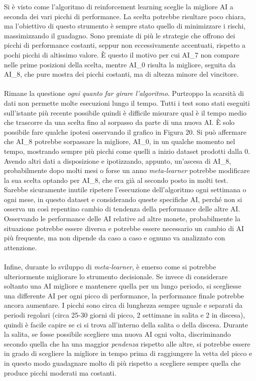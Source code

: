 \documentclass[a4paper,12pt]{report}
\begin{document}
\begin{fig}
Si è visto come l'algoritmo di reinforcement learning sceglie la migliore AI a seconda dei vari picchi di performance. La scelta potrebbe risultare poco chiara, ma l'obiettivo di questo strumento è sempre stato quello di minimizzare i rischi, massimizzando il guadagno. Sono premiate di più le strategie che offrono dei picchi di performance costanti, seppur non eccessivamente accentuati, rispetto a pochi picchi di altissimo valore. È questo il motivo per cui AI\_7 non compare nelle prime posizioni della scelta, mentre AI\_0 risulta la migliore, seguita da AI\_8, che pure mostra dei picchi costanti, ma di altezza minore del vincitore.
\\~\\Rimane la questione \textit{ogni quanto far girare l'algoritmo}. Purtroppo la scarsità di dati non permette molte esecuzioni lungo il tempo. Tutti i test sono stati eseguiti sull'istante più recente possibile quindi è difficile misurare qual è il tempo medio che trascorre da una scelta fino al sorpasso da parte di una nuova AI. È solo possibile fare qualche ipotesi osservando il grafico in Figura 20. Si può affermare che AI\_8 potrebbe sorpassare la migliore, AI\_0, in un qualche momento nel tempo, mostrando sempre più picchi come quelli a inizio dataset prodotti dalla 0. Avendo altri dati a disposizione e ipotizzando, appunto, un'ascesa di AI\_8, probabilmente dopo molti mesi o forse un anno \textit{meta-learner} potrebbe modificare la sua scelta optando per AI\_8, che era già al secondo posto in molti test. Sarebbe sicuramente inutile ripetere l'esecuzione dell'algoritmo ogni settimana o ogni mese, in questo dataset e considerando queste specifiche AI, perché non si osserva un così repentino cambio di tendenza della performance delle altre AI.\\Osservando le performance delle AI relative ad altre monete, probabilmente la situazione potrebbe essere diversa e potrebbe essere necessario un cambio di AI più frequente, ma non dipende da caso a caso e ognuno va analizzato con attenzione.
\\~\\Infine, durante lo sviluppo di \textit{meta-learner}, è emerso come si potrebbe ulteriormente migliorare lo strumento decisionale. Se invece di considerare soltanto una AI migliore e mantenere quella per un lungo periodo, si scegliesse una differente AI per ogni picco di performance, la performance finale potrebbe ancora aumentare. I picchi sono circa di lunghezza sempre uguale e separati da periodi regolari (circa 25-30 giorni di picco, 2 settimane in salita e 2 in discesa), quindi è facile capire se ci si trova all'interno della salita o della discesa. Durante la salita, se fosse possibile scegliere una nuova AI ogni volta, discriminando secondo quella che ha una maggior \textit{pendenza} rispetto alle altre, si potrebbe essere in grado di scegliere la migliore in tempo prima di raggiungere la vetta del picco e in questo modo guadagnare molto di più rispetto a scegliere sempre quella che produce picchi moderati ma costanti.

\end{fig}
\end{document}
